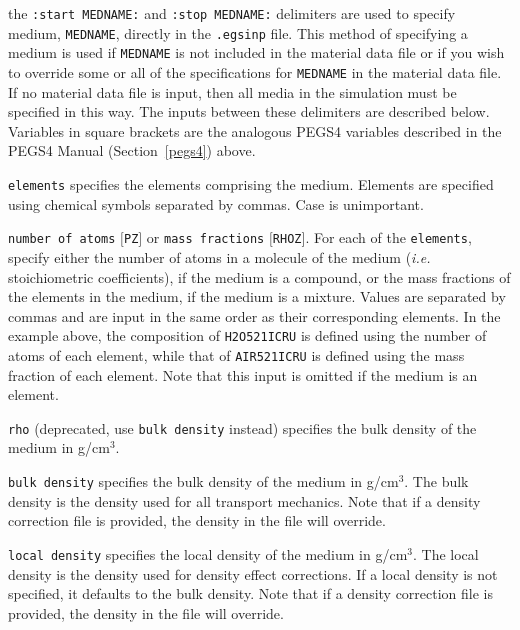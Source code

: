\begin{description}
\item the {\tt :start MEDNAME:} and {\tt :stop MEDNAME:} delimiters are used to specify medium, {\tt MEDNAME}, directly in the
{\tt .egsinp} file.  This method of specifying a medium is used if {\tt MEDNAME} is not included in the material data file or
if you wish to override some or all of the specifications for {\tt MEDNAME} in the material data file.
If no material data file is input, then all media in the simulation
must be specified in this way.  The inputs between these delimiters are described below.  Variables
in square brackets are the analogous PEGS4 variables described in the PEGS4 Manual (Section~\ref{pegs4}) above.
\begin{description}
\item {\tt elements} specifies the elements comprising the medium.  Elements are specified using chemical symbols separated by
commas.  Case is unimportant.
\item {\tt number of atoms} $[${\tt PZ}$]$ or {\tt mass fractions} $[${\tt RHOZ}$]$.  For each of the {\tt elements}, specify either the number of atoms in a molecule of the medium ({\it i.e.} stoichiometric coefficients), if the
medium is a compound, or the mass fractions of the elements in the medium,
if the medium is a mixture.
Values are separated by commas and are input in the same order as their corresponding elements.  In the example above,
the composition of {\tt H2O521ICRU} is
defined using the number of atoms of each element, while that of {\tt AIR521ICRU} is defined using the mass fraction of each element.  Note that this input
is omitted if the medium is an element.
\item {\tt rho} (deprecated, use {\tt bulk density} instead) specifies the bulk density of the medium in g/cm$^3$.
\item {\tt bulk density} specifies the bulk density of the medium in g/cm$^3$. The bulk density is the density used for all transport mechanics. Note that if a density correction file is provided, the density in the file will override.
\item {\tt local density} specifies the local density of the medium in g/cm$^3$. The local density is the density used for density effect corrections. If a local density is not specified, it defaults to the bulk density. Note that if a density correction file is provided, the density in the file will override.

\end{description}
\end{description}
